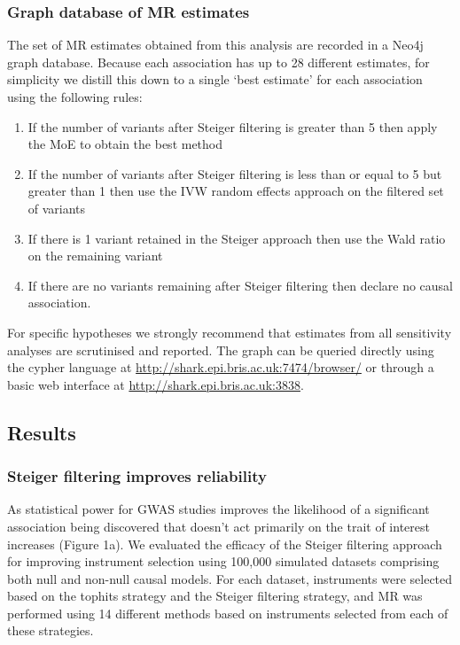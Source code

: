 \documentclass[]{article}
\providecommand{\tightlist}{%
  \setlength{\itemsep}{0pt}\setlength{\parskip}{0pt}}
\begin{document}
\subsubsection{Graph database of MR
estimates}\label{graph-database-of-mr-estimates}

The set of MR estimates obtained from this analysis are recorded in a
Neo4j graph database. Because each association has up to 28 different
estimates, for simplicity we distill this down to a single `best
estimate' for each association using the following rules:

\begin{enumerate}
\def\labelenumi{\arabic{enumi}.}
\tightlist
\item
  If the number of variants after Steiger filtering is greater than 5
  then apply the MoE to obtain the best method
\item
  If the number of variants after Steiger filtering is less than or
  equal to 5 but greater than 1 then use the IVW random effects approach
  on the filtered set of variants
\item
  If there is 1 variant retained in the Steiger approach then use the
  Wald ratio on the remaining variant
\item
  If there are no variants remaining after Steiger filtering then
  declare no causal association.
\end{enumerate}

For specific hypotheses we strongly recommend that estimates from all
sensitivity analyses are scrutinised and reported. The graph can be
queried directly using the cypher language at
\url{http://shark.epi.bris.ac.uk:7474/browser/} or through a basic web
interface at \url{http://shark.epi.bris.ac.uk:3838}.

\subsection{Results}\label{results}

\subsubsection{Steiger filtering improves
reliability}\label{steiger-filtering-improves-reliability}

As statistical power for GWAS studies improves the likelihood of a
significant association being discovered that doesn't act primarily on
the trait of interest increases (Figure 1a). We evaluated the efficacy
of the Steiger filtering approach for improving instrument selection
using 100,000 simulated datasets comprising both null and non-null
causal models. For each dataset, instruments were selected based on the
tophits strategy and the Steiger filtering strategy, and MR was
performed using 14 different methods based on instruments selected from
each of these strategies.
\end{document}
